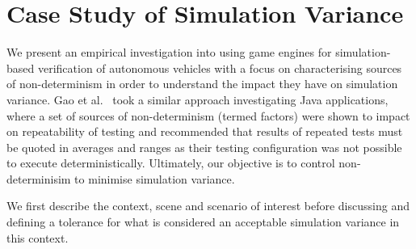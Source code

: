 \documentclass[letterpaper, 10 pt, journal, twoside]{IEEEtran}
\begin{document}
%
%


\section{Case Study of Simulation Variance} \label{s:case-study}

We present an empirical investigation into using game engines for
simulation-based verification of autonomous vehicles with a focus on
characterising sources of non-determinism in order to understand  the impact
they have on simulation variance. 
%
%
Gao et al.~\cite{when-and-what-should-we-control} took a similar approach investigating Java applications, where a set of sources of non-determinism (termed factors) were shown to impact on repeatability of testing and recommended that results of repeated tests must be quoted in averages and ranges as their testing configuration was not possible to execute deterministically. 
%
Ultimately, our objective is to control non-determinisim to minimise simulation variance.

%
We first describe the context, scene and scenario of interest before discussing and defining a tolerance for what is considered an acceptable simulation variance in this context.
%
%
\end{document}
